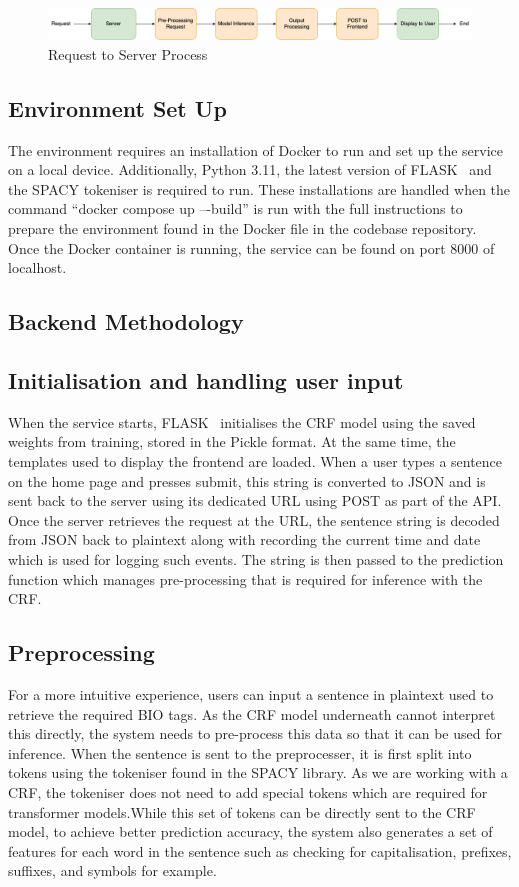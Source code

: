 \documentclass{surreydissertation}
\begin{document}
\begin{figure}[H]
    \centering
    \includegraphics[width=0.9\linewidth]{Figures/NLPsystemoverview1.png}
    \caption{Request to Server Process}
    \label{fig:NLPsystemoverview1}
 \end{figure}

\subsection{Environment Set Up}
The environment requires an installation of Docker to run and set up the service on a local device. Additionally, Python 3.11, the latest version of FLASK~\cite{flask} and the SPACY tokeniser is required to run. These installations are handled when the command “docker compose up –-build” is run with the full instructions to prepare the environment found in the Docker file in the codebase repository. Once the Docker container is running, the service can be found on port 8000 of localhost. 

\subsection{Backend Methodology}
\subsection{Initialisation and handling user input}
When the service starts, FLASK~\cite{flask} initialises the CRF model using the saved weights from training, stored in the Pickle format. At the same time, the templates used to display the frontend are loaded. When a user types a sentence on the home page and presses submit, this string is converted to JSON and is sent back to the server using its dedicated URL using POST as part of the API. Once the server retrieves the request at the URL, the sentence string is decoded from JSON back to plaintext along with recording the current time and date which is used for logging such events. The string is then passed to the prediction function which manages pre-processing that is required for inference with the CRF.

\subsection{Preprocessing}
For a more intuitive experience, users can input a sentence in plaintext used to retrieve the required BIO tags. As the CRF model underneath cannot interpret this directly, the system needs to pre-process this data so that it can be used for inference. When the sentence is sent to the preprocesser, it is first split into tokens using the tokeniser found in the SPACY library. As we are working with a CRF, the tokeniser does not need to add special tokens which are required for transformer models.While this set of tokens can be directly sent to the CRF model, to achieve better prediction accuracy, the system also generates a set of features for each word in the sentence such as checking for capitalisation, prefixes, suffixes, and symbols for example.
\end{document}

